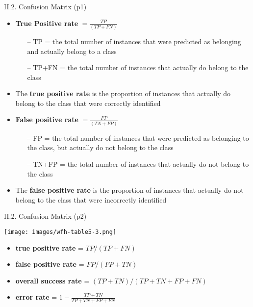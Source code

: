 \documentclass[handout]{beamer}
\newcommand{\stronger}[1]{\textbf{\color{purple} #1}}
\begin{document}
\begin{frame}{II.2. Confusion Matrix (p1)}
\begin{itemize}
\item \stronger{True Positive rate} $=\frac{TP}{(TP+FN)}$
	\begin{itemize}
	\item[--] TP = the total number of instances that were predicted as belonging and actually belong to a class
	\item[--] TP+FN = the total number of instances that actually do belong to the class
	\end{itemize}
\item The \stronger{true positive rate} is the proportion of instances that actually do belong to the class that were correctly identified
\item[]
\item \stronger{False positive rate} $=\frac{FP}{(TN+FP)}$
	\begin{itemize}
	\item[--] FP = the total number of instances that were predicted as belonging to the class, but actually do not belong to the class
	\item[--] TN+FP = the total number of instances that actually do not belong to the class
	\end{itemize}
\item The \stronger{false positive rate} is the proportion of instances that actually do not belong to the class that were incorrectly identified
\end{itemize}
\end{frame}
\begin{frame}{II.2. Confusion Matrix (p2)}
\begin{center}
\texttt{[image: images/wfh-table5-3.png]} \\
\cite[Table 5.3]{WFH4:2016}
\end{center}
\begin{itemize}
\item \stronger{true positive rate} = $TP / ( TP + FN )$
\item \stronger{false positive rate} = $FP / ( FP + TN )$
\item \stronger{overall success rate} = $( TP + TN )/( TP + TN + FP + FN )$
\item \stronger{error rate} = $1 - \frac{ TP + TN }{ TP + TN + FP + FN }$
\end{itemize}
\end{frame}
\end{document}

